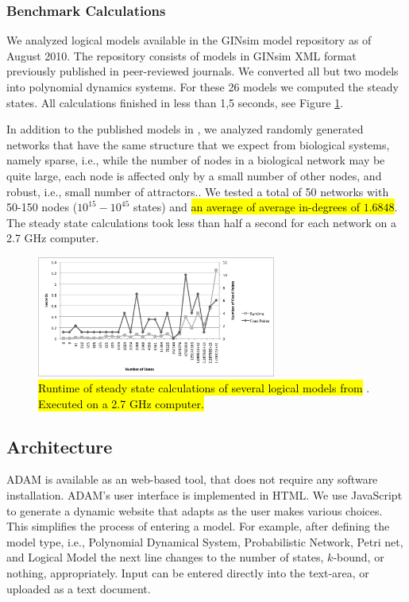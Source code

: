 \documentclass[10pt]{bmc_article}
\newenvironment{bmcformat}{\begin{raggedright}\baselineskip20pt\sloppy\setboolean{publ}{false}}{\end{raggedright}\baselineskip20pt\sloppy}
\begin{document}
\begin{bmcformat}

\subsubsection*{Benchmark Calculations}
We analyzed logical models
available in the GINsim model repository \cite{GINsimRepo} as of August 2010. The
repository consists of models in GINsim XML format previously published in
peer-reviewed journals. We converted all but two models into polynomial
dynamics systems. For these 26 models we computed the steady states. All
calculations finished in less than 1,5 seconds, see
Figure \ref{fig:chart}.

In addition to the published models in \cite{GINsimRepo}, we analyzed
randomly generated networks
that have the same structure that we
expect from biological systems, namely sparse, i.e., while the number of nodes in a biological network may be quite large, each node is affected only by a small number of other nodes, and robust, i.e., small number of attractors.. We tested a total of 50 networks with
50-150 nodes ($10^{15} - 10^{45}$ states) and \hl{an average of average in-degrees of $1.6848$}. The
steady state calculations took less than half a second for each network on
a 2.7 GHz computer.
\begin{figure}[htb]
\centering
\includegraphics[width=0.7\textwidth]{GINSimChart.png}
\caption{\hl{Runtime of steady state calculations of several logical models from}
\cite{GINsimRepo}. \hl{Executed on a 2.7 GHz computer.}}
\label{fig:chart}
\end{figure}

\subsection*{Architecture}
ADAM is available as an web-based tool, that does not require any software installation. ADAM's user interface is implemented in HTML. We use JavaScript to generate a dynamic website that adapts as the user makes various choices. This simplifies the process of entering a model. For example, after defining the model type, i.e., Polynomial Dynamical System, Probabilistic Network, Petri net, and Logical Model the next line changes to the number of states, $k$-bound, or nothing, appropriately. Input can be entered directly into the text-area, or uploaded as a text document.


\end{bmcformat}
\end{document}
